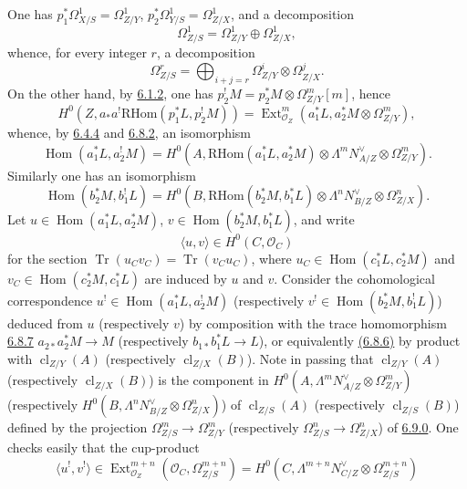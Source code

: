 \documentclass[11pt]{article}
\DeclareMathOperator{\Hom}{Hom}
\DeclareMathOperator{\Ext}{Ext}
\providecommand{\RHom}{\mathrm{RHom}}
\providecommand{\cl}{\operatorname{cl}}
\providecommand{\OO}{\mathcal{O}}
\providecommand{\RHom}{\mathrm{RHom}}
\providecommand{\Hom}{\operatorname{Hom}}
\providecommand{\RHom}{\mathrm R\mathcal{H}om}
\providecommand{\cl}{\operatorname{cl}}
\providecommand{\RHom}{\mathrm{RHom}}
\providecommand{\Hom}{\operatorname{Hom}}
\providecommand{\cl}{\operatorname{cl}}
\begin{document}
One has $p_1^*\Omega^1_{X/S}=\Omega^1_{Z/Y}$, $p_2^*\Omega^1_{Y/S}=\Omega^1_{Z/X}$, and a decomposition
\[
\Omega^1_{Z/S}=\Omega^1_{Z/Y}\oplus\Omega^1_{Z/X},
\]
whence, for every integer $r$, a decomposition
\begin{equation}
\tag{6.9.0}\label{sga5:III:equation:6.9.0}
\Omega^r_{Z/S}=\bigoplus_{i+j=r}\Omega^i_{Z/Y}\otimes\Omega^j_{Z/X}.
\end{equation}
On the other hand, by \hyperref[sga5:III:equation:6.1.2]{6.1.2}, one has $p_2^!M=p_2^*M\otimes\Omega^m_{Z/Y}[m]$, hence
\[
H^0(Z,a_*a^!\RHom(p_1^*L,p_2^!M))=\Ext^m_{\OO_Z}(a_1^*L,a_2^*M\otimes\Omega^m_{Z/Y}),
\]
whence, by \hyperref[sga5:III:equation:6.4.4]{6.4.4} and \hyperref[sga5:III:equation:6.8.2]{6.8.2}, an isomorphism
\begin{equation}
\tag{6.9.1}\label{sga5:III:equation:6.9.1}
\Hom(a_1^*L,a_2^!M)=H^0(A,\RHom(a_1^*L,a_2^*M)\otimes\Lambda^m N_{A/Z}^{\vee}\otimes\Omega^m_{Z/Y}).
\end{equation}
Similarly one has an isomorphism
\begin{equation}
\tag{6.9.2}\label{sga5:III:equation:6.9.2}
\Hom(b_2^*M,b_1^!L)=H^0(B,\RHom(b_2^*M,b_1^*L)\otimes\Lambda^n N_{B/Z}^{\vee}\otimes\Omega^n_{Z/X}).
\end{equation}
Let $u\in\Hom(a_1^*L,a_2^*M)$, $v\in\Hom(b_2^*M,b_1^*L)$, and write
\begin{equation}
\tag{6.9.3}\label{sga5:III:equation:6.9.3}
\langle u,v\rangle\in H^0(C,\OO_C)
\end{equation}
for the section $\operatorname{Tr}(u_Cv_C)=\operatorname{Tr}(v_Cu_C)$, where $u_C\in\Hom(c_1^*L,c_2^*M)$ and $v_C\in\Hom(c_2^*M,c_1^*L)$ are induced by $u$ and $v$. Consider the cohomological correspondence $u^!\in\Hom(a_1^*L,a_2^!M)$ (respectively $v^!\in\Hom(b_2^*M,b_1^!L)$) deduced from $u$ (respectively $v$) by composition with the trace homomorphism \hyperref[sga5:III:equation:6.8.7]{6.8.7} $a_{2*}a_2^*M\to M$ (respectively $b_{1*}b_1^*L\to L$), or equivalently \hyperref[sga5:III:equation:6.8.6]{(6.8.6)} by product with $\cl_{Z/Y}(A)$ (respectively $\cl_{Z/X}(B)$). Note in passing that $\cl_{Z/Y}(A)$ (respectively $\cl_{Z/X}(B)$) is the component in $H^0(A,\Lambda^mN_{A/Z}^{\vee}\otimes\Omega^m_{Z/Y})$ (respectively $H^0(B,\Lambda^nN_{B/Z}^{\vee}\otimes\Omega^n_{Z/X})$) of $\cl_{Z/S}(A)$ (respectively $\cl_{Z/S}(B)$) defined by the projection $\Omega^m_{Z/S}\to\Omega^m_{Z/Y}$ (respectively $\Omega^n_{Z/S}\to\Omega^n_{Z/X}$) of \hyperref[sga5:III:equation:6.9.0]{6.9.0}. One checks easily that the cup-product
\[
\langle u^!,v^!\rangle\in\Ext^{m+n}_{\OO_Z}(\OO_C,\Omega^{m+n}_{Z/S})=H^0(C,\Lambda^{m+n}N_{C/Z}^{\vee}\otimes\Omega^{m+n}_{Z/S})
\]
\end{document}
